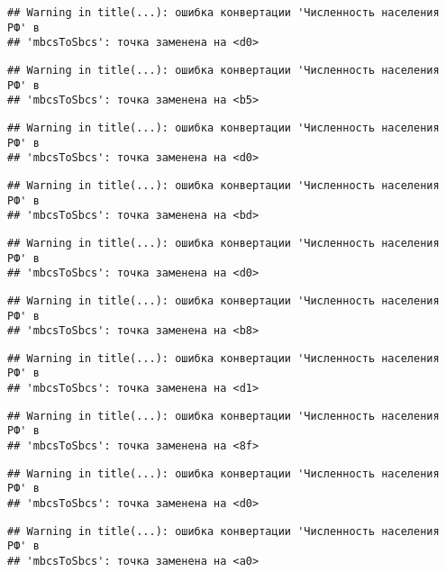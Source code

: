\documentclass[
]{article}
\begin{document}
\begin{verbatim}
## Warning in title(...): ошибка конвертации 'Численность населения РФ' в
## 'mbcsToSbcs': точка заменена на <d0>
\end{verbatim}

\begin{verbatim}
## Warning in title(...): ошибка конвертации 'Численность населения РФ' в
## 'mbcsToSbcs': точка заменена на <b5>
\end{verbatim}

\begin{verbatim}
## Warning in title(...): ошибка конвертации 'Численность населения РФ' в
## 'mbcsToSbcs': точка заменена на <d0>
\end{verbatim}

\begin{verbatim}
## Warning in title(...): ошибка конвертации 'Численность населения РФ' в
## 'mbcsToSbcs': точка заменена на <bd>
\end{verbatim}

\begin{verbatim}
## Warning in title(...): ошибка конвертации 'Численность населения РФ' в
## 'mbcsToSbcs': точка заменена на <d0>
\end{verbatim}

\begin{verbatim}
## Warning in title(...): ошибка конвертации 'Численность населения РФ' в
## 'mbcsToSbcs': точка заменена на <b8>
\end{verbatim}

\begin{verbatim}
## Warning in title(...): ошибка конвертации 'Численность населения РФ' в
## 'mbcsToSbcs': точка заменена на <d1>
\end{verbatim}

\begin{verbatim}
## Warning in title(...): ошибка конвертации 'Численность населения РФ' в
## 'mbcsToSbcs': точка заменена на <8f>
\end{verbatim}

\begin{verbatim}
## Warning in title(...): ошибка конвертации 'Численность населения РФ' в
## 'mbcsToSbcs': точка заменена на <d0>
\end{verbatim}

\begin{verbatim}
## Warning in title(...): ошибка конвертации 'Численность населения РФ' в
## 'mbcsToSbcs': точка заменена на <a0>
\end{verbatim}
\end{document}
